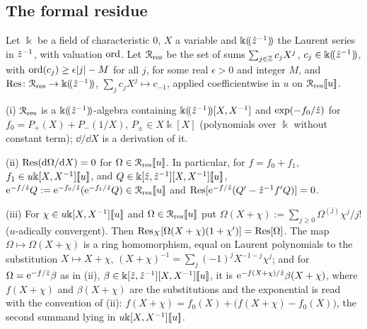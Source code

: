 \subsection{The formal residue}
\label{sec:fsp-res}

\begin{lem}
\label{lem:fsp-res}
Let $\Bbbk$ be a field of characteristic $0$, $X$ a variable and $\Bbbk(\!(\hat{z}^{-1})\!)$ the Laurent series in $\hat{z}^{-1}$, with valuation $\operatorname{ord}$. Let $\mathcal{R}_{\mathrm{res}}$ be the set of sums $\sum_{j\in\mathbb{Z}}c_jX^j$, $c_j\in\Bbbk(\!(\hat{z}^{-1})\!)$, with $\operatorname{ord}(c_j)\geq\epsilon|j|-M$ for all $j$, for some real $\epsilon>0$ and integer $M$, and $\operatorname*{Res}\colon\mathcal{R}_{\mathrm{res}}\to\Bbbk(\!(\hat{z}^{-1})\!)$, $\sum_jc_jX^j\mapsto c_{-1}$, applied coefficientwise in $u$ on $\mathcal{R}_{\mathrm{res}}[\![ u ]\!]$.

(i) $\mathcal{R}_{\mathrm{res}}$ is a $\Bbbk(\!(\hat{z}^{-1})\!)$-algebra containing $\Bbbk(\!(\hat{z}^{-1})\!)[X,X^{-1}]$ and $\exp(-f_0/\hat{z})$ for $f_0=P_+(X)+P_-(1/X)$, $P_\pm\in X\Bbbk[X]$ (polynomials over $\Bbbk$ without constant term); $\dd/\dd X$ is a derivation of it.

(ii) $\operatorname*{Res}(\mathrm{d}\Omega/\mathrm{d} X)=0$ for $\Omega\in\mathcal{R}_{\mathrm{res}}[\![ u ]\!]$. In particular, for $f=f_0+f_1$, $f_1\in u\Bbbk[X,X^{-1}][\![ u ]\!]$, and $Q\in\Bbbk[\hat{z},\hat{z}^{-1}][X,X^{-1}][\![ u ]\!]$, $\mathrm{e}^{-f/\hat{z}}Q:=\mathrm{e}^{-f_0/\hat{z}}(\mathrm{e}^{-f_1/\hat{z}}Q)\in\mathcal{R}_{\mathrm{res}}[\![ u ]\!]$ and $\operatorname*{Res}[\mathrm{e}^{-f/\hat{z}}(Q'-\hat{z}^{-1}f'Q)]=0$.

(iii) For $\chi\in u\Bbbk[X,X^{-1}][\![ u ]\!]$ and $\Omega\in\mathcal{R}_{\mathrm{res}}[\![ u ]\!]$ put $\Omega(X+\chi):=\sum_{j\geq0}\Omega^{(j)}\chi^j/j!$ ($u$-adically convergent). Then $\operatorname*{Res}_X[\Omega(X+\chi)(1+\chi')]=\operatorname*{Res}[\Omega]$. The map $\Omega\mapsto\Omega(X+\chi)$ is a ring homomorphism, equal on Laurent polynomials to the substitution $X\mapsto X+\chi$, $(X+\chi)^{-1}=\sum_j(-1)^jX^{-1-j}\chi^j$; and for $\Omega=\mathrm{e}^{-f/\hat{z}}\beta$ as in (ii), $\beta\in\Bbbk[\hat{z},\hat{z}^{-1}][X,X^{-1}][\![ u ]\!]$, it is $\mathrm{e}^{-f(X+\chi)/\hat{z}}\beta(X+\chi)$, where $f(X+\chi)$ and $\beta(X+\chi)$ are the substitutions and the exponential is read with the convention of (ii): $f(X+\chi)=f_0(X)+\bigl(f(X+\chi)-f_0(X)\bigr)$, the second summand lying in $u\Bbbk[X,X^{-1}][\![ u ]\!]$.
\end{lem}

